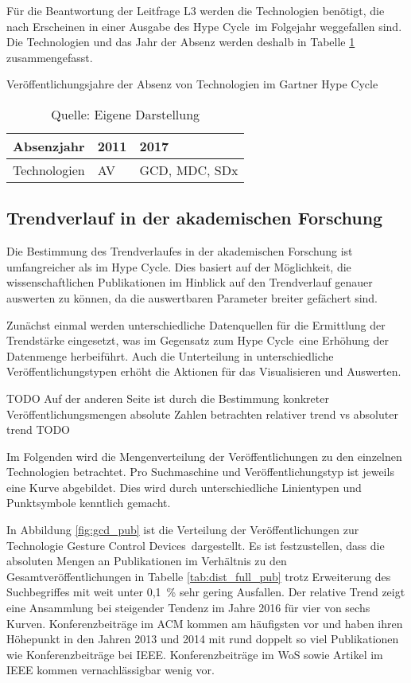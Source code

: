 Für die Beantwortung der Leitfrage L3 werden die Technologien benötigt, die nach Erscheinen in einer Ausgabe des \glqq Hype Cycle\grqq~im Folgejahr weggefallen sind. Die Technologien und das Jahr der Absenz werden deshalb in Tabelle \ref{tab:ghc_abscence} zusammengefasst.

\begin{table}
	\caption{Veröffentlichungsjahre der Absenz von Technologien im \glqq Gartner Hype Cycle\grqq}
	\selectfont
	\centering
	\label{tab:ghc_abscence}
	\begin{tabularx}{\linewidth}{X|XX}
		Absenzjahr & 2011 & 2017  \\
		\hline
		Technologien & \acs{AV} & \acs{GCD}, \acs{MDC}, \acs{SDx} \\
	\end{tabularx}
	\caption*{Quelle: Eigene Darstellung}
\end{table}

\subsection{Trendverlauf in der akademischen Forschung}
Die Bestimmung des Trendverlaufes in der akademischen Forschung ist umfangreicher als im \glqq Hype Cycle\grqq. Dies basiert auf der Möglichkeit, die wissenschaftlichen Publikationen im Hinblick auf den Trendverlauf genauer auswerten zu können, da die auswertbaren Parameter breiter gefächert sind.

Zunächst einmal werden unterschiedliche Datenquellen für die Ermittlung der Trendstärke eingesetzt, was im Gegensatz zum \glqq Hype Cycle\grqq~eine Erhöhung der Datenmenge herbeiführt. Auch die Unterteilung in unterschiedliche Veröffentlichungstypen erhöht die Aktionen für das Visualisieren und Auswerten.

TODO
Auf der anderen Seite ist durch die Bestimmung konkreter Veröffentlichungsmengen 
absolute Zahlen betrachten
relativer trend vs absoluter trend
TODO

Im Folgenden wird die Mengenverteilung der Veröffentlichungen zu den einzelnen Technologien betrachtet. Pro Suchmaschine und Veröffentlichungstyp ist jeweils eine Kurve abgebildet. Dies wird durch unterschiedliche Linientypen und Punktsymbole kenntlich gemacht.

In Abbildung \ref{fig:gcd_pub} ist die Verteilung der Veröffentlichungen zur Technologie \glqq Gesture Control Devices\grqq~dargestellt. Es ist festzustellen, dass die absoluten Mengen an Publikationen im Verhältnis zu den Gesamtveröffentlichungen in Tabelle \ref{tab:dist_full_pub} trotz Erweiterung des Suchbegriffes mit weit unter 0,1~\% sehr gering Ausfallen. Der relative Trend zeigt eine Ansammlung bei steigender Tendenz im Jahre 2016 für vier von sechs Kurven. Konferenzbeiträge im \ac{ACM} kommen am häufigsten vor und haben ihren Höhepunkt in den Jahren 2013 und 2014 mit rund doppelt so viel Publikationen wie Konferenzbeiträge bei \ac{IEEE}. Konferenzbeiträge im \ac{WoS} sowie Artikel im \ac{IEEE} kommen vernachlässigbar wenig vor.

